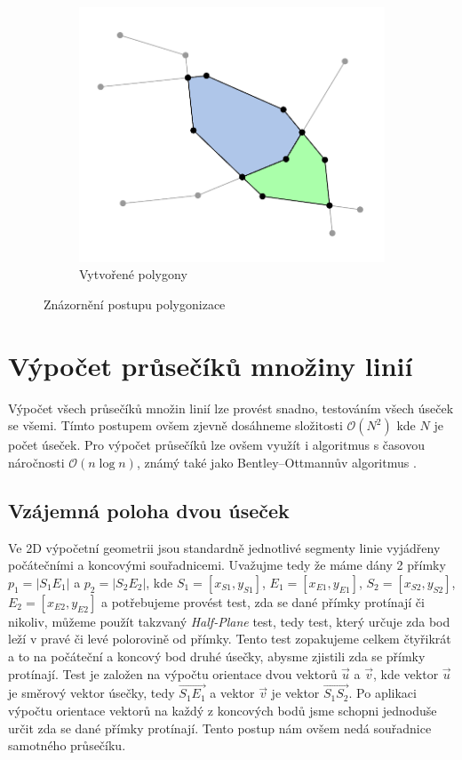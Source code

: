 \begin{figure}[h]
\begin{subfigure}{0.5\textwidth}
\end{subfigure}\hfil %
\begin{subfigure}{0.5\textwidth}
  \includegraphics[width=\linewidth]{./pictures/5/fuzzy_3.pdf}
  \caption{Vytvořené polygony}
  \label{fig:2-fuzzy_2}
\end{subfigure}\hfil %
\caption{Znázornění postupu polygonizace}
\end{figure}

\section{Výpočet průsečíků množiny linií}
Výpočet všech průsečíků množin linií lze provést snadno, testováním všech úseček se všemi. Tímto postupem ovšem zjevně dosáhneme složitosti $\mathcal{O}(N^2)$ kde $N$ je počet úseček. Pro výpočet průsečíků lze ovšem využít i algoritmus s časovou náročnosti $\mathcal{O}(n\log{}n)$, známý také jako Bentley–Ottmannův algoritmus \cite{bentley1979algorithms}.

\subsection{Vzájemná poloha dvou úseček}
Ve 2D výpočetní geometrii jsou standardně jednotlivé segmenty linie vyjádřeny počátečními a koncovými souřadnicemi. Uvažujme tedy že máme dány 2 přímky $p_1 = |S_1 E_1|$ a $p_2 = |S_2 E_2|$, kde $S_1 = [x_{S1},y_{S1}]$, $E_1 = [x_{E1},y_{E1}]$, $S_2 = [x_{S2},y_{S2}]$, $E_2 = [x_{E2},y_{E2}]$ a potřebujeme provést test, zda se dané přímky protínají či nikoliv, můžeme použít takzvaný \textit{Half-Plane} test, tedy test, který určuje zda bod leží v pravé či levé polorovině od přímky. Tento test zopakujeme celkem čtyřikrát a to na počáteční a koncový bod druhé úsečky, abysme zjistili zda se přímky protínají. Test je založen na výpočtu orientace dvou vektorů $\vec{u}$  a $\vec{v}$, kde vektor $\vec{u}$ je směrový vektor úsečky, tedy $\overrightarrow{S_1E_1}$ a vektor $\vec{v}$ je vektor $\overrightarrow{S_1S_2}$. Po aplikaci výpočtu orientace vektorů na každý z koncových bodů jsme schopni jednoduše určit zda se dané přímky protínají. Tento postup nám ovšem nedá souřadnice samotného průsečíku.

